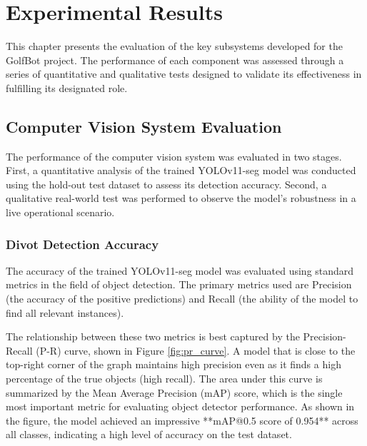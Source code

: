
\chapter{Experimental Results}
\label{chap:validation}
This chapter presents the evaluation of the key subsystems developed for the GolfBot project. The performance of each component was assessed through a series of quantitative and qualitative tests designed to validate its effectiveness in fulfilling its designated role.

\section{Computer Vision System Evaluation}
\label{sec:cv_evaluation}
The performance of the computer vision system was evaluated in two stages. First, a quantitative analysis of the trained YOLOv11-seg model was conducted using the hold-out test dataset to assess its detection accuracy. Second, a qualitative real-world test was performed to observe the model's robustness in a live operational scenario.

\subsection{Divot Detection Accuracy}
\label{ssec:cv_accuracy}
The accuracy of the trained YOLOv11-seg model was evaluated using standard metrics in the field of object detection. The primary metrics used are Precision (the accuracy of the positive predictions) and Recall (the ability of the model to find all relevant instances).

The relationship between these two metrics is best captured by the Precision-Recall (P-R) curve, shown in Figure \ref{fig:pr_curve}. A model that is close to the top-right corner of the graph maintains high precision even as it finds a high percentage of the true objects (high recall). The area under this curve is summarized by the Mean Average Precision (mAP) score, which is the single most important metric for evaluating object detector performance. As shown in the figure, the model achieved an impressive **mAP@0.5 score of 0.954** across all classes, indicating a high level of accuracy on the test dataset.

